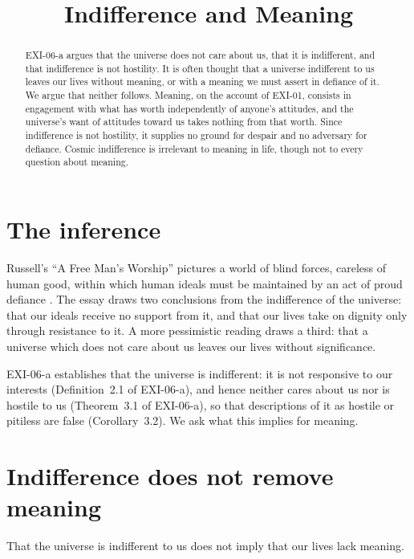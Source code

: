 \documentclass{situationist-preprint}
\title{Indifference and Meaning}
\begin{document}
\maketitle

\begin{abstract}
EXI-06-a argues that the universe does not care about us, that it is indifferent, and that indifference is not hostility. It is often thought that a universe indifferent to us leaves our lives without meaning, or with a meaning we must assert in defiance of it. We argue that neither follows. Meaning, on the account of EXI-01, consists in engagement with what has worth independently of anyone's attitudes, and the universe's want of attitudes toward us takes nothing from that worth. Since indifference is not hostility, it supplies no ground for despair and no adversary for defiance. Cosmic indifference is irrelevant to meaning in life, though not to every question about meaning.
\end{abstract}

\section{The inference}

Russell's \enquote{A Free Man's Worship} pictures a world of blind forces, careless of human good, within which human ideals must be maintained by an act of proud defiance \citep{Russell1903}. The essay draws two conclusions from the indifference of the universe: that our ideals receive no support from it, and that our lives take on dignity only through resistance to it. A more pessimistic reading draws a third: that a universe which does not care about us leaves our lives without significance.

EXI-06-a establishes that the universe is indifferent: it is not responsive to our interests (Definition~2.1 of EXI-06-a), and hence neither cares about us nor is hostile to us (Theorem~3.1 of EXI-06-a), so that descriptions of it as hostile or pitiless are false (Corollary~3.2). We ask what this implies for meaning.

\section{Indifference does not remove meaning}

\begin{proposition}\label{p:meaning}
That the universe is indifferent to us does not imply that our lives lack meaning.
\end{proposition}
\end{document}
